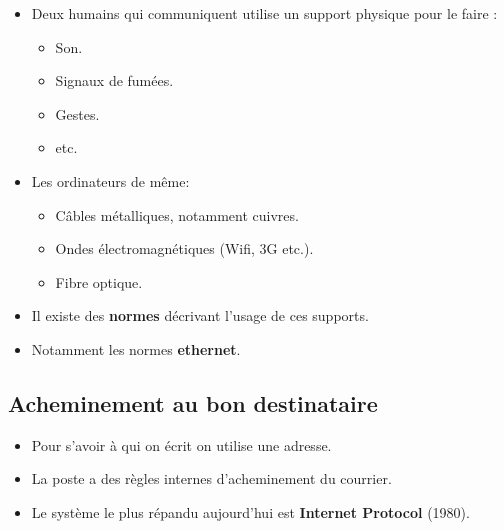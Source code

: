 \begin{frame}
	\begin{itemize}
		\item Deux humains qui communiquent utilise un support physique pour le faire :
 			\begin{itemize}
				\item Son. 
				\item Signaux de fumées.
				\item Gestes.
				\item etc.
			\end{itemize}
		\item Les ordinateurs de même:
			\begin{itemize}
				\item Câbles métalliques, notamment cuivres.
				\item Ondes électromagnétiques (Wifi, 3G etc.).
				\item Fibre optique. %
			\end{itemize} 
		\item Il existe des \textbf{normes} décrivant l'usage de ces supports.
		\item Notamment les normes \textbf{ethernet}.
	\end{itemize}
\end{frame}


\subsection{Acheminement au bon destinataire}

\begin{frame}
	\begin{itemize}
		\item Pour s'avoir à qui on écrit on utilise une adresse.
		\item La poste a des règles internes d'acheminement du courrier.
		\item Le système le plus répandu aujourd'hui est \textbf{Internet Protocol} (1980).
	\end{itemize}
\end{frame}

